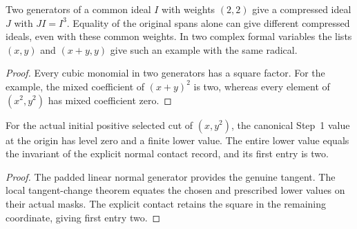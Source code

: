 \begin{theorem}
\label{hir:g1-two-vertex-compression}
\leanok
Two generators of a common ideal $I$ with weights $(2,2)$ give a
compressed ideal $J$ with $JI=I^3$. Equality of the original spans
alone can give different compressed ideals, even with these common
weights. In two complex formal variables the lists $(x,y)$ and
$(x+y,y)$ give such an example with the same radical.
\end{theorem}
\begin{proof}
Every cubic monomial in two generators has a square factor. For
the example, the mixed coefficient of $(x+y)^2$ is two, whereas
every element of $(x^2,y^2)$ has mixed coefficient zero.
\end{proof}

\begin{theorem}
\label{hir:g1-finite-example-canonical-normal-contact}
\leanok
For the actual initial positive selected cut of $(x,y^2)$, the
canonical Step~1 value at the origin has level zero and a finite
lower value. The entire lower value equals the invariant of the
explicit normal contact record, and its first entry is two.
\end{theorem}
\begin{proof}
The padded linear normal generator provides the genuine tangent.
The local tangent-change theorem equates the chosen and prescribed
lower values on their actual masks. The explicit contact retains
the square in the remaining coordinate, giving first entry two.
\end{proof}

